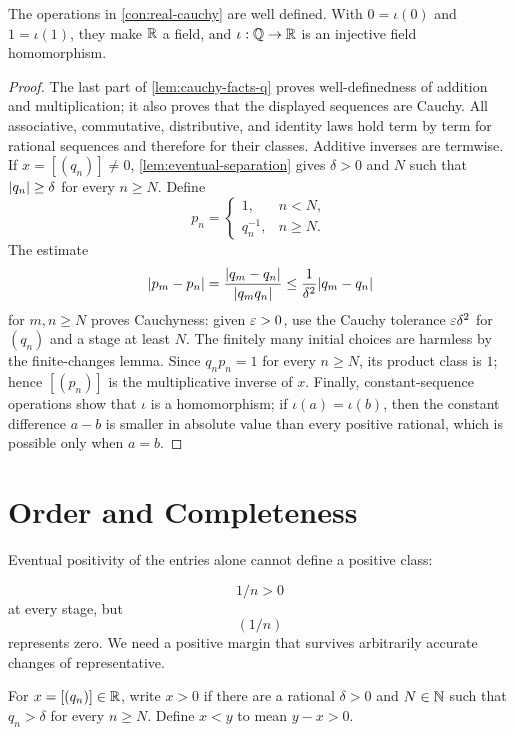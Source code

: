 \begin{proposition}
\label{prop:real-algebra}
The operations in \cref{con:real-cauchy} are well defined. With $0=\iota(0)$ and $1=\iota(1)$, they make $\R$ a field, and $\iota:\mathbb{Q}\to\mathbb{R}$ is an injective field homomorphism.
\end{proposition}
\begin{proof}
The last part of \cref{lem:cauchy-facts-q} proves well-definedness of addition and multiplication; it also proves that the displayed sequences are Cauchy. All associative, commutative, distributive, and identity laws hold term by term for rational sequences and therefore for their classes. Additive inverses are termwise. If $x=[(q_n)]\ne0$, \cref{lem:eventual-separation} gives $\delta>0$ and $N$ such that $\lvert q_n\rvert\geq\delta$ for every $n\geq N$. Define
\[
p_n=
\begin{cases}
1,&n<N,\\
q_n^{-1},&n\geq N.
\end{cases}
\]
The estimate
\[
\lvert p_m-p_n\rvert=\frac{\lvert q_m-q_n\rvert}{\lvert q_mq_n\rvert}\leq\frac{1}{\delta^2}\lvert q_m-q_n\rvert
\]
for $m,n\geq N$ proves Cauchyness: given $\varepsilon>0$, use the Cauchy tolerance $\varepsilon\delta^2$ for $(q_n)$ and a stage at least $N$. The finitely many initial choices are harmless by the finite-changes lemma. Since $q_np_n=1$ for every $n\geq N$, its product class is $1$; hence $[(p_n)]$ is the multiplicative inverse of $x$. Finally, constant-sequence operations show that $\iota$ is a homomorphism; if $\iota(a)=\iota(b)$, then the constant difference $a-b$ is smaller in absolute value than every positive rational, which is possible only when $a=b$.
\end{proof}

\section{Order and Completeness}

Eventual positivity of the entries alone cannot define a positive class:

\[
1/n>0
\]
 at every stage, but
\[
(1/n)
\]
 represents zero. We need a positive
margin that survives arbitrarily accurate changes of representative.
\begin{definition}[Order on $\R$]
For $x=[(q_n)]\in\mathbb{R}$, write $x>0$ if there are a rational $\delta>0$ and $N\in\mathbb{N}$ such that $q_n>\delta$ for every $n\geq N$. Define $x<y$ to mean $y-x>0$.
\end{definition}

